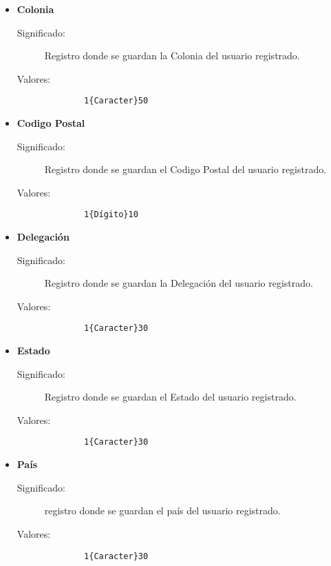 \begin{itemize}
  \item \textbf{Colonia}\label{dd:coloniaC}
    \begin{description}
      \item [Significado:] Registro donde se guardan la Colonia del usuario registrado.
      \item [Valores:]{\begin{lstlisting}
        1{Caracter}50\end{lstlisting}}
    \end{description}

  \item \textbf{Codigo Postal}\label{dd:cpC}
    \begin{description}
      \item [Significado:] Registro donde se guardan el Codigo Postal del usuario registrado.
      \item [Valores:]{\begin{lstlisting}
        1{Dígito}10\end{lstlisting}}
    \end{description}

  \item \textbf{Delegación}\label{dd:delegC}
    \begin{description}
      \item [Significado:] Registro donde se guardan la Delegación del usuario registrado.
      \item [Valores:]{\begin{lstlisting}
        1{Caracter}30\end{lstlisting}}
    \end{description}

  \item \textbf{Estado}\label{dd:edoC}
    \begin{description}
      \item [Significado:] Registro donde se guardan el Estado del usuario registrado.
      \item [Valores:]{\begin{lstlisting}
        1{Caracter}30\end{lstlisting}}
    \end{description}

  \item \textbf{País}\label{dd:paisC}
    \begin{description}
      \item [Significado:] registro donde se guardan el país del usuario registrado.
      \item [Valores:]{\begin{lstlisting}
        1{Caracter}30\end{lstlisting}}
    \end{description}
\end{itemize}


